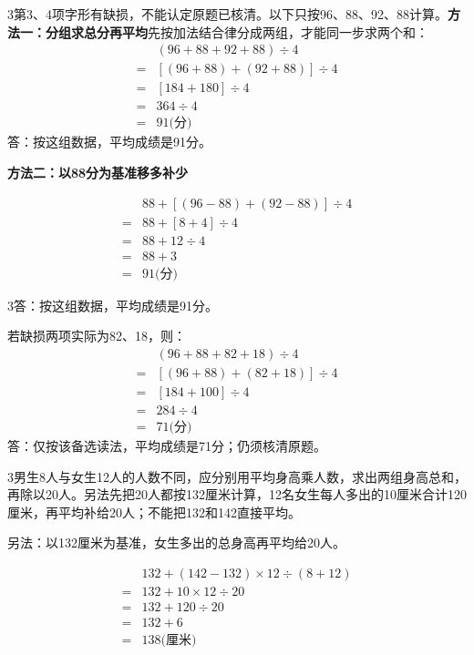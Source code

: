 \documentclass[multi=snippet,border={5bp 20bp 5bp 5bp}]{standalone}
\newenvironment{snippet}[3]{\begin{minipage}{#1bp}\color{answerred}\fontsize{#2}{#3}\selectfont\raggedright}{\end{minipage}}
\begin{document}
\begin{snippet}{505}{11.5}{14}\begin{multicols}{3}\raggedcolumns 第3、4项字形有缺损，不能认定原题已核清。以下只按96、88、92、88计算。\textbf{方法一：分组求总分再平均}先按加法结合律分成两组，才能同一步求两个和：\[\begin{aligned}&(96+88+92+88)\div4\\={}&[(96+88)+(92+88)]\div4\\={}&[184+180]\div4\\={}&364\div4\\={}&91\text{(分)}\end{aligned}\]答：按这组数据，平均成绩是91分。\par\textbf{方法二：以88分为基准移多补少}\end{multicols}\[\begin{aligned}&88+[(96-88)+(92-88)]\div4\\={}&88+[8+4]\div4\\={}&88+12\div4\\={}&88+3\\={}&91\text{(分)}\end{aligned}\]\begin{multicols}{3}\raggedcolumns 答：按这组数据，平均成绩是91分。\par 若缺损两项实际为82、18，则：\[\begin{aligned}&(96+88+82+18)\div4\\={}&[(96+88)+(82+18)]\div4\\={}&[184+100]\div4\\={}&284\div4\\={}&71\text{(分)}\end{aligned}\]答：仅按该备选读法，平均成绩是71分；仍须核清原题。\end{multicols}\end{snippet}
\begin{snippet}{505}{11.5}{14}\begin{multicols}{3}\raggedcolumns 男生8人与女生12人的人数不同，应分别用平均身高乘人数，求出两组身高总和，再除以20人。另法先把20人都按132厘米计算，12名女生每人多出的10厘米合计120厘米，再平均补给20人；不能把132和142直接平均。\par 另法：以132厘米为基准，女生多出的总身高再平均给20人。\end{multicols}\[\begin{aligned} &132+(142-132)\times12\div(8+12)\\={}&132+10\times12\div20\\={}&132+120\div20\\={}&132+6\\={}&138\text{(厘米)}\end{aligned}\]\end{snippet}
\end{document}
